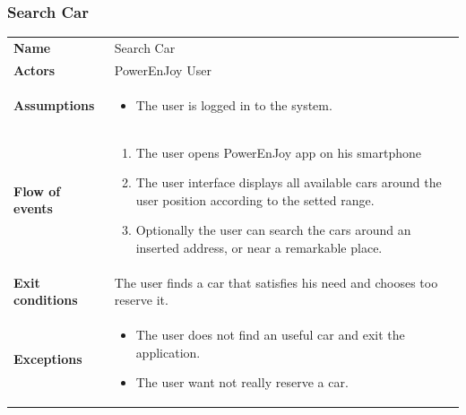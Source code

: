 \documentclass[english]{article}
\begin{document}
	\subsubsection{Search Car}
	\begin{center}
	\begin{tabular}{l||p{10cm}}
	\textbf{Name} 
		& Search Car\\ [8px]
	\textbf{Actors} 
		& PowerEnJoy User\\ [8px]
	\textbf{Assumptions} 
		& \begin{itemize}
			\item The user is logged in to the system.
		\end{itemize}\\
	\textbf{Flow of events}
		& \begin{enumerate}
	 		\item The user opens PowerEnJoy app on his smartphone 
	 		\item The user interface displays all available cars around the user position according to the setted range. 
			\item Optionally the user can search the cars around an inserted address, or near a remarkable place. 
		\end{enumerate}\\ 
	\textbf{Exit conditions}
		&The user finds a car that satisfies his need and chooses too reserve it.\\ [8px]
	\textbf{Exceptions}
		& \begin{itemize}
			\item The user does not find an useful car and exit the application.
			\item The user want not really reserve a car. 
		\end{itemize}
	\end{tabular}
	\end{center}
\end{document}
